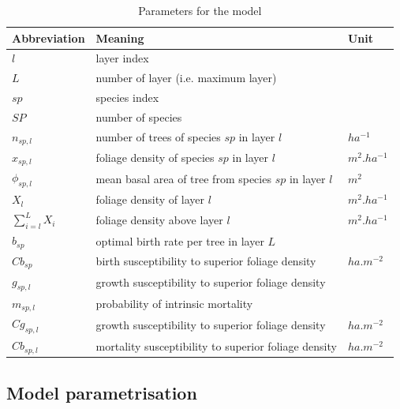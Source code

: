 \documentclass{article}
\begin{document}
\begin{table}[H]
    \centering
    \begin{tabular}{l l l}
    \hline
    \hline
    \textbf{Abbreviation} & \textbf{Meaning} & \textbf{Unit} \\
    \hline
    \hline
    $l$            & layer index                                                 &          \\
    $L$            & number of layer (i.e. maximum layer)                        &          \\
    $sp$           & species index                                               &          \\
    $SP$           & number of species                                           &            \\
    $n_{sp,l}$     & number of trees of species $sp$ in layer $l$                & $ha^{-1}$  \\    
    $x_{sp,l}$     & foliage density of species $sp$ in layer $l$                & $m^2.ha^{-1}$  \\
    $\phi_{sp,l}$     & mean basal area of tree from species $sp$ in layer $l$    & $m^2$  \\
    $X_{l}$        & foliage density of layer $l$                                & $m^2.ha^{-1}$  \\ 
    $\sum_{i = l}^{L} X_{i}$     & foliage density above layer $l$      & $m^2.ha^{-1}$  \\ 
    $b_{sp}$       & optimal birth rate per tree in layer $L$    &  \\
    $Cb_{sp}$      & birth susceptibility to superior foliage density    & $ha.m^{-2}$           \\
    $g_{sp,l}$     & growth susceptibility to superior foliage density           &  \\
    $m_{sp,l}$     & probability of intrinsic mortality           & \\
    $Cg_{sp,l}$    & growth susceptibility to superior foliage density            &   $ha.m^{-2}$  \\
    $Cb_{sp,l}$    & mortality susceptibility to superior foliage density            & $ha.m^{-2}$    \\
    \hline
    \hline
    \end{tabular}
    \caption{Parameters for the model}
    \label{tab:coef}
\end{table}

\subsection{Model parametrisation}
\end{document}
